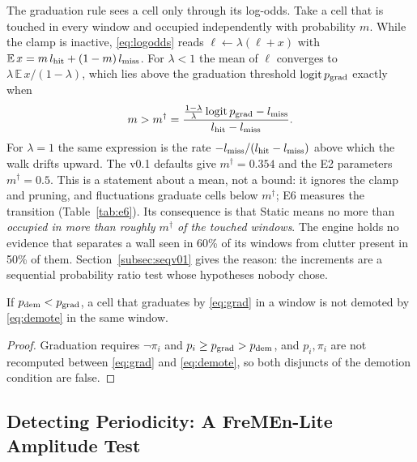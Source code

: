 \begin{remark}\label{rem:drift}
The graduation rule sees a cell only through its log-odds. Take a cell that is touched in every window and occupied independently with probability $m$. While the clamp is inactive, \eqref{eq:logodds} reads $\ell\leftarrow\lambda(\ell+x)$ with $\mathbb{E}\,x=m\,l_{\mathrm{hit}}+(1-m)\,l_{\mathrm{miss}}$. For $\lambda<1$ the mean of $\ell$ converges to $\lambda\,\mathbb{E}\,x/(1-\lambda)$, which lies above the graduation threshold $\operatorname{logit}p_{\mathrm{grad}}$ exactly when
\begin{equation}\label{eq:mdagger}
  m>m^\dagger=\frac{\tfrac{1-\lambda}{\lambda}\operatorname{logit}p_{\mathrm{grad}}-l_{\mathrm{miss}}}{l_{\mathrm{hit}}-l_{\mathrm{miss}}}.
\end{equation}
For $\lambda=1$ the same expression is the rate $-l_{\mathrm{miss}}/(l_{\mathrm{hit}}-l_{\mathrm{miss}})$ above which the walk drifts upward. The v0.1 defaults give $m^\dagger=0.354$ and the E2 parameters $m^\dagger=0.5$. This is a statement about a mean, not a bound: it ignores the clamp and pruning, and fluctuations graduate cells below $m^\dagger$; E6 measures the transition (Table~\ref{tab:e6}). Its consequence is that Static means no more than \emph{occupied in more than roughly $m^\dagger$ of the touched windows}. The engine holds no evidence that separates a wall seen in 60\% of its windows from clutter present in 50\% of them. Section~\ref{subsec:seqv01} gives the reason: the increments are a sequential probability ratio test whose hypotheses nobody chose.
\end{remark}

\begin{proposition}\label{prop:nooscillation}
If $p_{\mathrm{dem}}<p_{\mathrm{grad}}$, a cell that graduates by \eqref{eq:grad} in a window is not demoted by \eqref{eq:demote} in the same window.
\end{proposition}
\begin{proof}
Graduation requires $\lnot\pi_i$ and $p_i\ge p_{\mathrm{grad}}>p_{\mathrm{dem}}$, and $p_i,\pi_i$ are not recomputed between \eqref{eq:grad} and \eqref{eq:demote}, so both disjuncts of the demotion condition are false.
\end{proof}

\subsection{Detecting Periodicity: A FreMEn-Lite Amplitude Test}\label{subsec:fremen}


